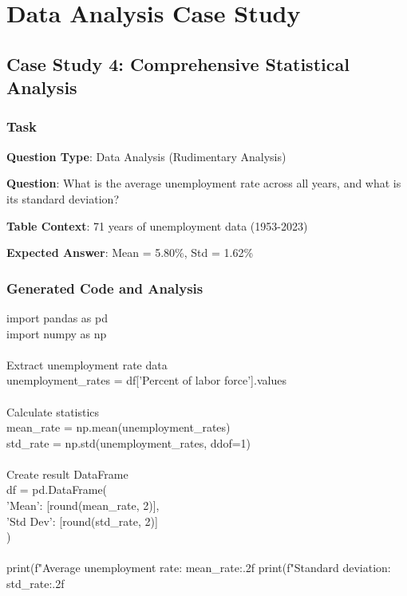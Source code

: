 \newpage

\section{Data Analysis Case Study}

\subsection{Case Study 4: Comprehensive Statistical Analysis}

\subsubsection{Task}

\textbf{Question Type}: Data Analysis (Rudimentary Analysis)

\textbf{Question}: What is the average unemployment rate across all years, and what is its standard deviation?

\textbf{Table Context}: 71 years of unemployment data (1953-2023)

\textbf{Expected Answer}: Mean = 5.80\%, Std = 1.62\%

\subsubsection{Generated Code and Analysis}

import pandas as pd \\
import numpy as np \\
\\
 Extract unemployment rate data \\
unemployment\_rates = df['Percent of labor force'].values \\
\\
 Calculate statistics \\
mean\_rate = np.mean(unemployment\_rates) \\
std\_rate = np.std(unemployment\_rates, ddof=1) \\
\\
 Create result DataFrame \\
df = pd.DataFrame({ \\
    'Mean': [round(mean\_rate, 2)], \\
    'Std Dev': [round(std\_rate, 2)] \\
}) \\
\\
print(f"Average unemployment rate: {mean\_rate:.2f}%
print(f"Standard deviation: {std\_rate:.2f}%
\\

